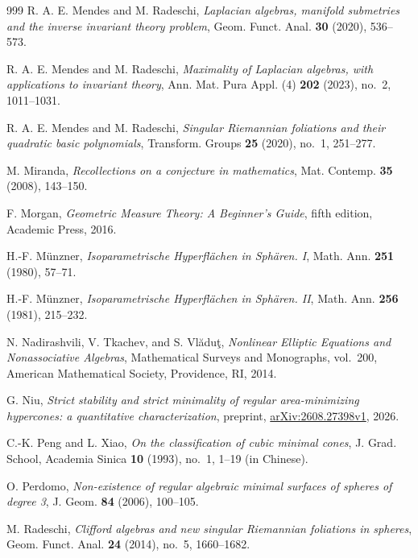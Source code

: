 \begin{thebibliography}{999}
R. A. E. Mendes and M. Radeschi,
\emph{Laplacian algebras, manifold submetries and the inverse invariant
theory problem}, Geom. Funct. Anal. \textbf{30} (2020), 536--573.

R. A. E. Mendes and M. Radeschi,
\emph{Maximality of Laplacian algebras, with applications to invariant theory},
Ann. Mat. Pura Appl. (4) \textbf{202} (2023), no.~2, 1011--1031.

R. A. E. Mendes and M. Radeschi,
\emph{Singular Riemannian foliations and their quadratic basic
polynomials}, Transform. Groups \textbf{25} (2020), no.~1, 251--277.

M. Miranda,
\emph{Recollections on a conjecture in mathematics},
Mat. Contemp. \textbf{35} (2008), 143--150.

F. Morgan,
\emph{Geometric Measure Theory: A Beginner's Guide},
fifth edition, Academic Press, 2016.

H.-F. M\"unzner,
\emph{Isoparametrische Hyperfl\"achen in Sph\"aren. I},
Math. Ann. \textbf{251} (1980), 57--71.

H.-F. M\"unzner,
\emph{Isoparametrische Hyperfl\"achen in Sph\"aren. II},
Math. Ann. \textbf{256} (1981), 215--232.

N. Nadirashvili, V. Tkachev, and S. Vl\u{a}du\c{t},
\emph{Nonlinear Elliptic Equations and Nonassociative Algebras},
Mathematical Surveys and Monographs, vol.~200, American Mathematical
Society, Providence, RI, 2014.

G. Niu,
\emph{Strict stability and strict minimality of regular area-minimizing
hypercones: a quantitative characterization},
preprint, \href{https://arxiv.org/abs/2608.27398v1}{arXiv:2608.27398v1}, 2026.

C.-K. Peng and L. Xiao,
\emph{On the classification of cubic minimal cones},
J. Grad. School, Academia Sinica \textbf{10} (1993), no.~1, 1--19
(in Chinese).

O. Perdomo,
\emph{Non-existence of regular algebraic minimal surfaces of spheres
of degree 3}, J. Geom. \textbf{84} (2006), 100--105.

M. Radeschi,
\emph{Clifford algebras and new singular Riemannian foliations in spheres},
Geom. Funct. Anal. \textbf{24} (2014), no.~5, 1660--1682.


\end{thebibliography}
